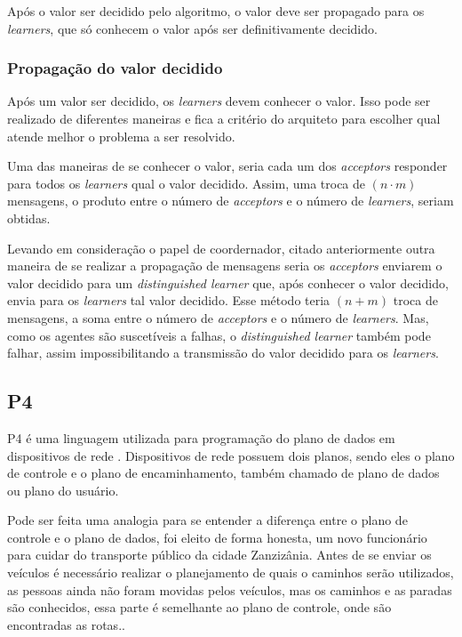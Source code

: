 \documentclass[
    12pt,
    openright, 
    oneside,
    a4paper,
    french,
    english,
    brazil
    ]{facom-ufu-abntex2}
\theoremstyle{definition}
\begin{document}
Após o valor ser decidido pelo algoritmo, o valor deve ser propagado para os \textit{learners},
que só conhecem o valor após ser definitivamente decidido.

\subsubsection{Propagação do valor decidido}
Após um valor ser decidido, os \textit{learners} devem conhecer o valor. Isso pode ser realizado
de diferentes maneiras e fica a critério do arquiteto para escolher qual atende melhor o
problema a ser resolvido.

Uma das maneiras de se conhecer o valor, seria cada um dos \textit{acceptors} responder para
todos os \textit{learners} qual o valor decidido. Assim, uma troca de $(n \cdot m)$ mensagens, 
o produto entre o número de \textit{acceptors} e o número de \textit{learners}, seriam obtidas.

Levando em consideração o papel de coordernador, citado anteriormente outra maneira de se 
realizar a propagação de mensagens seria os \textit{acceptors} enviarem o valor decidido para um
\textit{distinguished learner} que, após conhecer o valor decidido, envia para os
\textit{learners} tal valor decidido. Esse método teria $(n + m)$ troca de mensagens,
a soma entre o número de \textit{acceptors} e o número de \textit{learners}. Mas, como os
agentes são suscetíveis a falhas, o \textit{distinguished learner} também pode falhar,
assim impossibilitando a transmissão do valor decidido para os \textit{learners}.

\subsection{P4}
P4 é uma linguagem utilizada para programação do plano de dados em  dispositivos de 
rede \cite{paxos16spec}. Dispositivos de rede possuem dois planos, sendo eles o 
plano de controle e o plano de encaminhamento, também chamado de plano de dados ou 
plano do usuário. 

Pode ser feita uma analogia para se entender a diferença entre o 
plano de controle e o plano de dados, foi eleito de forma honesta, um novo 
funcionário para cuidar do transporte público da cidade Zanzizânia. Antes de se 
enviar os veículos é necessário realizar o planejamento de quais o caminhos serão
utilizados, as pessoas ainda não foram movidas pelos veículos, mas os caminhos 
e as paradas são conhecidos, essa parte é semelhante ao plano de controle, onde 
são encontradas as rotas.\cite{dataVsControl}.
\end{document}
